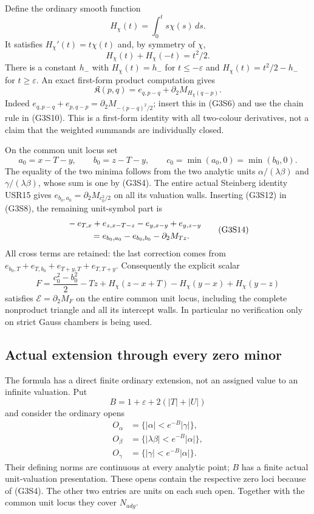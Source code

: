 Define the ordinary smooth function
\[
 H_\chi(t)=\int_0^t s\chi(s)\,ds.
 \tag{G3S10}
\]
It satisfies $H_\chi'(t)=t\chi(t)$ and, by symmetry of $\chi$,
\[
 H_\chi(t)+H_\chi(-t)=t^2/2.
 \tag{G3S11}
\]
There is a constant $h_-$ with $H_\chi(t)=h_-$ for
$t\le-\varepsilon$ and $H_\chi(t)=t^2/2-h_-$ for
$t\ge\varepsilon$.
An exact first-form product computation gives
\[
 \mathfrak K(p,q)=e_{q,p-q}+\partial_2M_{H_\chi(q-p)}.
 \tag{G3S12}
\]
Indeed $e_{q,p-q}+e_{p,q-p}=\partial_2M_{-(p-q)^2/2}$;
insert this in (G3S6) and use the chain rule in (G3S10).
This is a first-form identity with all two-colour derivatives,
not a claim that the weighted summands are individually closed.

On the common unit locus set
\[
 a_0=x-T-y,\qquad b_0=z-T-y,
 \qquad c_0=\min(a_0,0)=\min(b_0,0).
 \tag{G3S13}
\]
The equality of the two minima follows from the two analytic units
$\alpha/(\lambda\beta)$ and $\gamma/(\lambda\beta)$, whose sum
is one by (G3S4).  The entire actual Steinberg identity USR15 gives
$e_{b_0,a_0}=\partial_2M_{c_0^2/2}$ on all its valuation walls.
Inserting (G3S12) in (G3S8), the remaining unit-symbol part is
\[
 \begin{split}
 &-e_{T,x}+e_{z,x-T-z}-e_{y,x-y}+e_{y,z-y}\\
 &\hspace{10mm}=e_{b_0,a_0}-e_{b_0,b_0}
                                    -\partial_2M_{Tz}.
 \end{split}
 \tag{G3S14}
\]
All cross terms are retained: the last correction comes from
$e_{b_0,T}+e_{T,b_0}+e_{T+y,T}+e_{T,T+y}$.
Consequently the explicit scalar
\[
 F=\frac{c_0^2-b_0^2}{2}-Tz
       +H_\chi(z-x+T)-H_\chi(y-x)+H_\chi(y-z)
 \tag{G3S15}
\]
satisfies $\mathcal E=\partial_2M_F$ on the entire common unit
locus, including the complete nonproduct triangle and all its
intercept walls.  In particular no verification only on strict
Gauss chambers is being used.

\subsection{Actual extension through every zero minor}

The formula has a direct finite ordinary extension, not an assigned
value to an infinite valuation.  Put
\[
 B=1+\varepsilon+2(|T|+|U|)
 \tag{G3S16}
\]
and consider the ordinary opens
\[
 \begin{split}
 O_\alpha&=\{|\alpha|<e^{-B}|\gamma|\},\\
 O_\beta&=\{|\lambda\beta|<e^{-B}|\alpha|\},\\
 O_\gamma&=\{|\gamma|<e^{-B}|\alpha|\}.
 \end{split}
 \tag{G3S17}
\]
Their defining norms are continuous at every analytic point;
$B$ has a finite actual unit-valuation presentation.  These opens
contain the respective zero loci because of (G3S4).  The other
two entries are units on each such open.  Together with the common
unit locus they cover $N_{adg}$.

